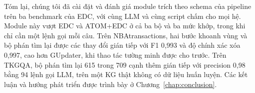 Tóm lại, chúng tôi đã cài đặt và đánh giá module trích theo schema của pipeline trên ba benchmark của EDC, với cùng LLM và cùng script chấm cho mọi hệ.
Module này vượt EDC và ATOM+EDC ở cả ba bộ và ba mức khớp, trong khi chỉ cần một lệnh gọi mỗi câu.
Trên NBAtransactions, hai bước khoanh vùng và bộ phán tìm lại được các thay đổi gián tiếp với F1 0,993 và độ chính xác xóa 0,997, cao hơn GUpdater, khi thao tác tường minh được cho trước. Trên TKGQA, bộ phán tìm lại 615 trong 709 cạnh thêm gián tiếp với precision 0,98 bằng 94 lệnh gọi LLM, trên một KG thật không có dữ liệu huấn luyện. Các kết luận và hướng phát triển được trình bày ở Chương~\ref{chap:conclusion}.
